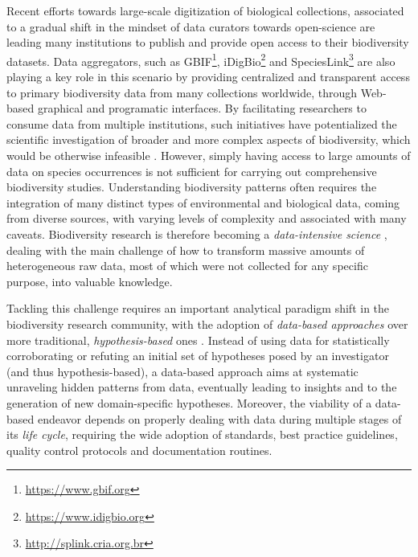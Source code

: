 Recent efforts towards large-scale digitization of biological collections, associated to a gradual shift in the mindset of data curators towards open-science are leading many institutions to publish and provide open access to their biodiversity datasets.
Data aggregators, such as GBIF\footnote{\url{https://www.gbif.org}}, iDigBio\footnote{\url{https://www.idigbio.org}} and SpeciesLink\footnote{\url{http://splink.cria.org.br}} are also playing a key role in this scenario by providing centralized and transparent access to primary biodiversity data from many collections worldwide, through Web-based graphical and programatic interfaces.
By facilitating researchers to consume data from multiple institutions, such initiatives have potentialized the scientific investigation of broader and more complex aspects of biodiversity, which would be otherwise infeasible \cite{James2018, Newbold2015}.
However, simply having access to large amounts of data on species occurrences is not sufficient for carrying out comprehensive biodiversity studies.
Understanding biodiversity patterns often requires the integration of many distinct types of environmental and biological data, coming from diverse sources, with varying levels of complexity and associated with many caveats.
Biodiversity research is therefore becoming a \textit{data-intensive science} \cite{Kelling2009}, dealing with the main challenge of how to transform massive amounts of heterogeneous raw data, most of which were not collected for any specific purpose, into valuable knowledge.

Tackling this challenge requires an important analytical paradigm shift in the biodiversity research community, with the adoption of \textit{data-based approaches} over more traditional, \textit{hypothesis-based} ones \cite{Kelling2009}.
Instead of using data for statistically corroborating or refuting an initial set of hypotheses posed by an investigator (and thus hypothesis-based), a data-based approach aims at systematic unraveling hidden patterns from data, eventually leading to insights and to the generation of new domain-specific hypotheses.
%
Moreover, the viability of a data-based endeavor depends on properly dealing with data during multiple stages of its \textit{life cycle}, requiring the wide adoption of standards, best practice guidelines, quality control protocols and documentation routines.

